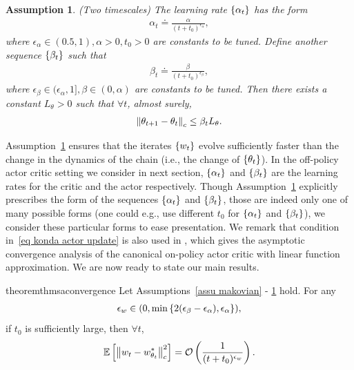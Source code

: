 \documentclass[twoside,11pt]{article}
\newcommand{\fO}{\mathcal{O}}
\newcommand{\E}{\mathbb{E}}
\newcounter{assucounter}
\numberwithin{assucounter}{section}
\newtheorem{assumption}[assucounter]{Assumption}
\begin{document}
\begin{assumption}
    \label{assu twotimescale}
    (Two timescales)
    The learning rate $\qty{\alpha_t}$ has the form
    \begin{align}
      \alpha_t \doteq \frac{\alpha}{(t+t_0)^{\epsilon_\alpha}}, 
    \end{align}
    where $\epsilon_\alpha \in (0.5, 1), \alpha > 0, t_0 > 0$ are constants to be tuned.
    Define another sequence $\qty{\beta_t}$ such that
    \begin{align}
    \beta_t \doteq \frac{\beta}{(t+t_0)^{\epsilon_\beta}},
    \end{align}
    where $\epsilon_\beta \in (\epsilon_\alpha, 1], \beta \in (0, \alpha)$ are constants to be tuned.
    Then there exists a constant $L_\theta > 0$ such that $\forall t$, almost surely,
    \begin{align}
      \label{eq konda actor update}
      \norm{\theta_{t+1} - \theta_t}_c \leq \beta_t L_\theta.
    \end{align}
\end{assumption}
Assumption~\ref{assu twotimescale} ensures that the iterates $\qty{w_t}$ evolve sufficiently faster than the change in the dynamics of the chain (i.e., the change of $\qty{\theta_t}$). 
In the off-policy actor critic setting we consider in next section,
$\qty{\alpha_t}$ and $\qty{\beta_t}$ are the learning rates for the critic and the actor respectively.
Though Assumption~\ref{assu twotimescale} explicitly prescribes the form of the sequences $\qty{\alpha_t}$ and $\qty{\beta_t}$,
those are indeed only one of many possible forms (one could e.g., use different $t_0$ for $\qty{\alpha_t}$ and $\qty{\beta_t}$), we consider these particular forms to ease presentation.
We remark that condition in~\eqref{eq konda actor update} is also used in \citet{konda2002thesis},
which gives the asymptotic convergence analysis of the canonical on-policy actor critic with linear function approximation.
We are now ready to state our main results.
\begin{restatable}{theorem}{thmsaconvergence}
    \label{thm sa convergence}
    Let Assumptions~\ref{assu makovian} - \ref{assu twotimescale} hold.
    For any
    \begin{align}
      \epsilon_w \in (0, \min\qty{2(\epsilon_\beta - \epsilon_\alpha), \epsilon_\alpha}),
    \end{align}
    if $t_0$ is sufficiently large,
    then $\forall t$,
    \begin{align}
      \E\left[\norm{w_t - w^*_{\theta_t}}_c^2\right] =\fO\left(\frac{1}{(t+t_0)^{\epsilon_w}}\right).
    \end{align}
\end{restatable}
\end{document}

